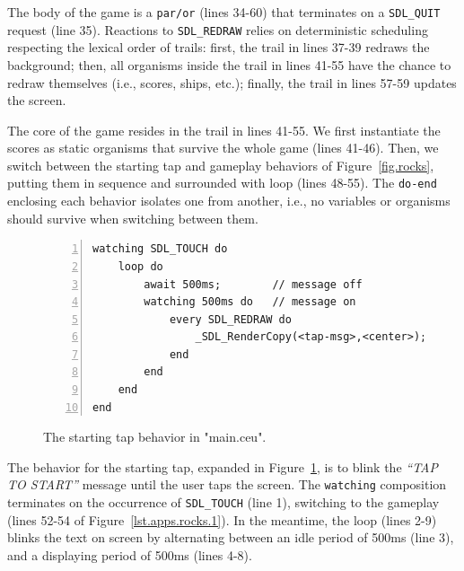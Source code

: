 \documentclass[preprint]{sigplanconf}
\newcommand{\code}[1] {{\small{\texttt{#1}}}}
\newcommand{\1}{\;}
\newcommand{\2}{\;\;}
\newcommand{\3}{\;\;\;}
\newcommand{\5}{\;\;\;\;\;}
\begin{document}
The body of the game is a \code{par/or} (lines 34-60) that terminates on a
\code{SDL\_QUIT} request (line 35).
%
Reactions to \code{SDL\_REDRAW} relies on deterministic scheduling respecting 
the lexical order of trails: first, the trail in lines 37-39 redraws the 
background; then, all organisms inside the trail in lines 41-55 have the chance 
to redraw themselves (i.e., scores, ships, etc.); finally, the trail in lines 
57-59 updates the screen.

The core of the game resides in the trail in lines 41-55.
We first instantiate the scores as static organisms that survive the whole game 
(lines 41-46).
Then, we switch between the starting tap and gameplay behaviors of 
Figure~\ref{fig.rocks}, putting them in sequence and surrounded with loop 
(lines 48-55).
The \code{do-end} enclosing each behavior isolates one from another, i.e., no 
variables or organisms should survive when switching between them.

\begin{figure}%
\begin{lstlisting}[numbers=left,xleftmargin=3em]
watching SDL_TOUCH do
    loop do
        await 500ms;        // message off
        watching 500ms do   // message on
            every SDL_REDRAW do
                _SDL_RenderCopy(<tap-msg>,<center>);
            end
        end
    end
end
\end{lstlisting}
\caption{ The starting tap behavior in "main.ceu".
\label{lst.apps.rocks.2}
}
\end{figure}

The behavior for the starting tap, expanded in Figure~\ref{lst.apps.rocks.2}, 
is to blink the \emph{``TAP TO START''} message until the user taps the screen.
The \code{watching} composition terminates on the occurrence of 
\code{SDL\_TOUCH} (line 1), switching to the gameplay (lines 52-54 of 
Figure~\ref{lst.apps.rocks.1}).
In the meantime, the loop (lines 2-9) blinks the text on screen by alternating 
between an idle period of 500ms (line 3), and a displaying period of 500ms 
(lines 4-8).
\end{document}
